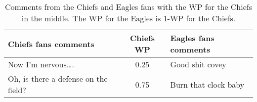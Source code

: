 \begin{table}[t]
    \centering
    \begin{tabular}{lcl}
        \toprule
        \textbf{Chiefs fans comments} & \textbf{Chiefs WP} & \textbf{Eagles fans comments} \\ \midrule
        Now I’m nervous…. & 0.25 & Good shit covey \\ \midrule
        Oh, is there a defense on the field? & 0.75 & Burn that clock baby \\ \bottomrule
    \end{tabular}
    \caption{Comments from the Chiefs and Eagles fans with the WP for the Chiefs in the middle. The WP for the Eagles is 1-WP for the Chiefs.}
    \label{tab:football-exs}
\end{table}
